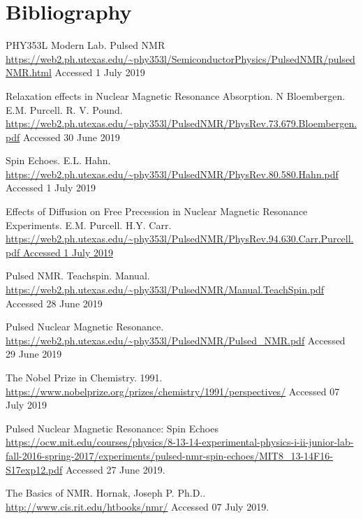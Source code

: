 \documentclass{article}
\begin{document}
\section{Bibliography}
\bigskip

PHY353L Modern Lab. Pulsed NMR \url{https://web2.ph.utexas.edu/~phy353l/SemiconductorPhysics/PulsedNMR/pulsedNMR.html} Accessed 1 July 2019



\bigskip
\par
Relaxation effects in Nuclear Magnetic Resonance Absorption. N Bloembergen. E.M. Purcell. R. V. Pound.
\url{https://web2.ph.utexas.edu/~phy353l/PulsedNMR/PhysRev.73.679.Bloembergen.pdf} Accessed 30 June 2019
\bigskip
\par
Spin Echoes. E.L. Hahn.
\url{https://web2.ph.utexas.edu/~phy353l/PulsedNMR/PhysRev.80.580.Hahn.pdf} Accessed 1 July 2019
\bigskip
\par
Effects of Diffusion on Free Precession in Nuclear Magnetic Resonance Experiments. E.M. Purcell. H.Y. Carr.
\url{https://web2.ph.utexas.edu/~phy353l/PulsedNMR/PhysRev.94.630.Carr.Purcell.pdf Accessed 1 July 2019}
\bigskip
\par
Pulsed NMR. Teachspin. Manual.
\url{https://web2.ph.utexas.edu/~phy353l/PulsedNMR/Manual.TeachSpin.pdf} Accessed 28 June 2019
\bigskip
\par
Pulsed Nuclear Magnetic Resonance.
\url{https://web2.ph.utexas.edu/~phy353l/PulsedNMR/Pulsed_NMR.pdf} Accessed 29 June 2019
\bigskip
\par
The Nobel Prize in Chemistry. 1991. \url{https://www.nobelprize.org/prizes/chemistry/1991/perspectives/} Accessed 07 July 2019
\bigskip
\par
Pulsed Nuclear Magnetic Resonance: Spin Echoes \url{https://ocw.mit.edu/courses/physics/8-13-14-experimental-physics-i-ii-junior-lab-fall-2016-spring-2017/experiments/pulsed-nmr-spin-echoes/MIT8_13-14F16-S17exp12.pdf} Accessed 27 June 2019.
\bigskip
\par

The Basics of NMR. Hornak, Joseph P. Ph.D..
\url{http://www.cis.rit.edu/htbooks/nmr/} Accessed 07 July 2019.
\end{document}
